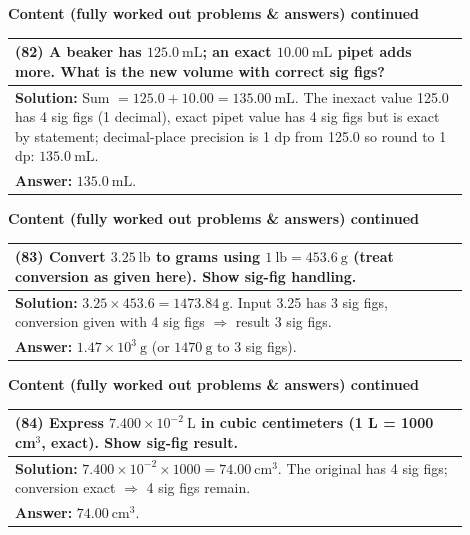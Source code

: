 \documentclass{article}
\begin{document}
\noindent
{\large \textbf{Content (fully worked out problems \& answers) continued}} \\[0.2em]
\begin{tabular}{|p{0.9\linewidth}|}
\hline
\vspace{0.2cm}

\textbf{(82)} A beaker has $125.0~\text{mL}$; an exact $10.00~\text{mL}$ pipet adds more. What is the new volume with correct sig figs? \\
\hline
\vspace{0.2cm}
\textbf{Solution:} Sum $=125.0+10.00=135.00~\text{mL}$. The inexact value 125.0 has 4 sig figs (1 decimal), exact pipet value has 4 sig figs but is exact by statement; decimal-place precision is 1 dp from 125.0 so round to 1 dp: $135.0~\text{mL}$. \\
\textbf{Answer:} $135.0~\text{mL}$. \\
\hline
\end{tabular}
\newpage

\noindent
{\large \textbf{Content (fully worked out problems \& answers) continued}} \\[0.2em]
\begin{tabular}{|p{0.9\linewidth}|}
\hline
\vspace{0.2cm}

\textbf{(83)} Convert $3.25~\text{lb}$ to grams using $1~\text{lb}=453.6~\text{g}$ (treat conversion as given here). Show sig-fig handling. \\
\hline
\vspace{0.2cm}
\textbf{Solution:} $3.25\times 453.6=1473.84~\text{g}$. Input 3.25 has 3 sig figs, conversion given with 4 sig figs $\Rightarrow$ result 3 sig figs. \\
\textbf{Answer:} $1.47\times 10^{3}~\text{g}$ (or $1470~\text{g}$ to 3 sig figs). \\
\hline
\end{tabular}
\newpage

\noindent
{\large \textbf{Content (fully worked out problems \& answers) continued}} \\[0.2em]
\begin{tabular}{|p{0.9\linewidth}|}
\hline
\vspace{0.2cm}

\textbf{(84)} Express $7.400\times 10^{-2}~\text{L}$ in cubic centimeters (1 L = 1000 cm$^3$, exact). Show sig-fig result. \\
\hline
\vspace{0.2cm}
\textbf{Solution:} $7.400\times10^{-2}\times1000=74.00~\text{cm}^3$. The original has 4 sig figs; conversion exact $\Rightarrow$ 4 sig figs remain. \\
\textbf{Answer:} $74.00~\text{cm}^3$. \\
\hline
\end{tabular}
\newpage
\end{document}

